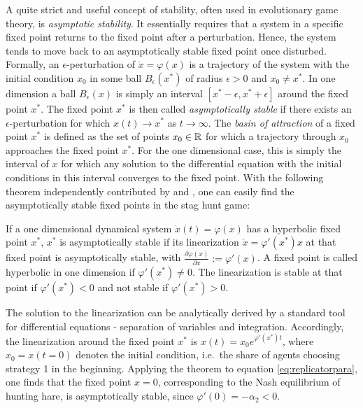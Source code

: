 A quite strict and useful concept of stability, often used in evolutionary 
game theory, is \textit{asymptotic stability}. 
It essentially requires that a system in a specific fixed point returns 
to the fixed point after a perturbation.
Hence, the system tends to move back to an asymptotically stable fixed point
once disturbed. Formally, an $\epsilon$-perturbation of 
$\dot{x} = \varphi(x)$ is a trajectory of the system with the initial
condition $x_0$ in some ball $B_\epsilon(x^*)$ of radius $\epsilon >0$ and 
$x_0 \neq x^*$. 
In one dimension a ball $B_{\epsilon}(x)$ is simply an interval 
$[x^*-\epsilon, x^*+\epsilon]$ around the fixed point $x^*$.
The fixed point $x^*$ is then called \textit{asymptotically
stable} if there exists an $\epsilon$-perturbation for which $x(t) \rightarrow
x^*$ as $t \rightarrow \infty$. 
The \textit{basin of attraction} of a fixed point $x^*$ is defined as the set 
of points $x_0 \in \mathbb{R}$ for which a trajectory through $x_0$ approaches 
the fixed point $x^*$. For the one dimensional case, 
this is simply the interval 
of $x$ for which any solution to the differential equation with the initial 
conditions in this interval converges to the fixed point. With the following 
theorem independently contributed by \textcite{hartman_lemma_1960} and 
\textcite{grobman_homeomorphism_1959}, one can easily 
find the asymptotically stable fixed points in the stag hunt game:
\begin{mydef}
        If a one dimensional dynamical system $\dot{x}(t) = \varphi(x)$ 
        has a hyperbolic fixed point $x^*$, $x^*$ is asymptotically stable
        if its linearization 
        $\dot{x} = \varphi'(x^*)x$ at that fixed point 
        is asymptotically stable, with
        $\frac{\partial \varphi(x)}{\partial x}:= \varphi'(x)$.
        A fixed point is called hyperbolic in one dimension if 
        $\varphi'(x^*) \neq 0$. The linearization is stable at that
        point if $\varphi'(x^*) < 0$ and not stable if $\varphi'(x^*) >0$.
\end{mydef}
The solution to the linearization can be analytically derived by 
a standard tool for differential equations - separation of variables and 
integration.
Accordingly, the linearization around the fixed point $x^*$ is 
$x(t)= x_0 e^{\varphi'(x^*)t}$, where $x_0=x(t=0)$ denotes the 
initial condition, i.e.\ the share of agents choosing strategy 1 in the 
beginning.
Applying the theorem to equation \eqref{eq:replicatorpara}, 
one finds that the 
fixed point $x=0$, corresponding to the Nash equilibrium of hunting hare, is 
asymptotically stable, since $\varphi'(0) = - \alpha_2 <0$. 
